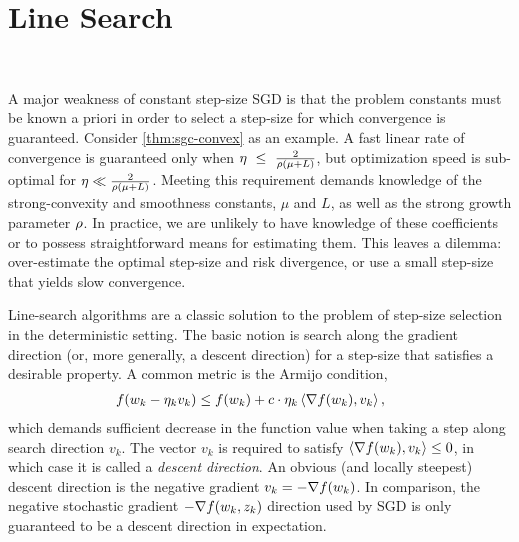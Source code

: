 
\chapter{Line Search}~\label{ch:line-search}

A major weakness of constant step-size \ac{SGD} is that the problem constants must be known a priori in order to select a step-size for which convergence is guaranteed.
Consider \autoref{thm:sgc-convex} as an example. 
A fast linear rate of convergence is guaranteed only when \( \eta~\leq~\frac{2}{\rho\left(\mu + L\right)} \), but optimization speed is sub-optimal for \( \eta \ll \frac{2}{\rho\left(\mu + L\right)} \).
Meeting this requirement demands knowledge of the strong-convexity and smoothness constants, \( \mu \) and \( L \), as well as the strong growth parameter \( \rho \).
In practice, we are unlikely to have knowledge of these coefficients or to possess straightforward means for estimating them.
This leaves a dilemma: over-estimate the optimal step-size and risk divergence, or use a small step-size that yields slow convergence. 

Line-search algorithms are a classic solution to the problem of step-size selection in the deterministic setting.
The basic notion is search along the gradient direction (or, more generally, a descent direction) for a step-size that satisfies a desirable property.
A common metric is the Armijo condition, 
 \begin{align}
     f(w_k - \eta_k v_k) &\leq f(w_k) + c \cdot \eta_k \left\langle\nabla f(w_k), v_k\right\rangle,~\label{eq:deterministic-armijo-ls}
\end{align}
which demands sufficient decrease in the function value when taking a step along search direction \( v_k \).
The vector \( v_k \) is required to satisfy \( \left\langle\nabla f(w_k), v_k\right\rangle \leq 0 \), in which case it is called a \emph{descent direction}.
An obvious (and locally steepest) descent direction is the negative gradient \( v_k = - \nabla f(w_k) \). 
In comparison, the negative stochastic gradient \( - \nabla f(w_k, z_{k}) \) direction used by \ac{SGD} is only guaranteed to be a descent direction in expectation.


